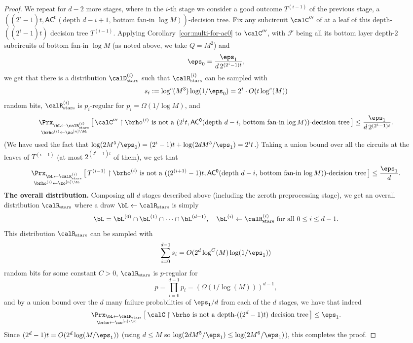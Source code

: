 \documentclass[11pt]{article}
\numberwithin{equation}{section}
\theoremstyle{definition}
\theoremstyle{plain}
\theoremstyle{plain}
\newcommand{\acz}{\mathsf{AC^0}}
\newcommand{\uhr}{\upharpoonright}
\newcommand{\stars}{\mathrm{stars}}
\begin{document}
\begin{proof}
 We repeat for $d-2$ more stages, where in the $i$-th stage we consider a good outcome $T^{(i-1)}$ of the previous stage, a $((2^{i}-1)t, \acz(\text{depth $d-i+1$, bottom fan-in $\log M$}))$-decision tree.  Fix any subcircuit $\calC'''$ of at a leaf of this depth-$((2^i-1)t)$ decision tree $T^{(i-1)}$.  Applying Corollary~\ref{cor:multi-for-ac0} to $\calC'''$, with $\mathscr{F}$ being all its bottom layer depth-$2$ subcircuits of bottom fan-in $\log M$ (as noted above, we take $Q = M^2$) and 
\[ \eps_0 = \frac{\eps_1}{d\,2^{(2^{i}-1)t}}, \] 
we get that there is a distribution $\calD_{\stars}^{(i)}$ such that $\calR_\stars^{(i)}$ can be sampled with 
\[ s_i := \log^c(M^3) \log(1/\eps_0) = 2^i \cdot O(t\log^c(M)) \] 
random bits, $\calR_\stars^{(i)}$ is $p_i$-regular for $p_i = \Omega(1/\log M)$, and
\[ \mathop{\Prx_{\bL\leftarrow\calR_\stars^{(i)}}}_{\brho^{(i)}\leftarrow\zo^{[n]\setminus \bL}}\big[\,\calC''' \uhr \brho^{(i)} \text{~is not a $(2^i t, \acz(\text{depth $d-i$, bottom fan-in $\log M$}))$-decision tree}\, \big] \le \frac{\eps_1}{d\,2^{(2^{i}-1)t}}. \]  
(We have used the fact that $\log(2M^{5}/\eps_0) = (2^i-1)t + \log(2dM^{5}/\eps_1) = 2^it$.)  Taking a union bound over all the circuits at the leaves of $T^{(i-1)}$ (at most $2^{(2^i-1)t}$ of them), we get that 
\[ \mathop{\Prx_{\bL\leftarrow\calR_\stars^{(i)}}}_{\brho^{(i)}\leftarrow\zo^{[n]\setminus \bL}}\big[\,T^{(i-1)} \uhr \brho^{(i)} \text{~is not a $((2^{(i+1)}-1)t, \acz(\text{depth $d-i$, bottom fan-in $\log M$}))$-decision tree}\, \big] \le \frac{\eps_1}{d}. \] 
{\bf The overall distribution.} Composing all $d$ stages described above (including the zeroth preprocessing stage), we get an overall distribution $\calR_\stars$ where a draw $\bL \leftarrow \calR_\stars$ is simply 
\[ \bL = \bL^{(0)} \cap \bL^{(1)} \cap \cdots \cap \bL^{(d-1)}, \quad \bL^{(i)} \leftarrow \calR_\stars^{(i)} \text{~for all $0\le i \le d-1$}. \]
This distribution $\calR_\stars$ can be sampled with 
\[ \sum_{i=0}^{d-1} s_i = O( 2^{d}  \log^C(M)\log(1/\eps_1)) \]
random bits for some constant $C > 0$, $\calR_\stars$ is $p$-regular for 
\[ p = \prod_{i=0}^{d-1} p_i = (\Omega(1/\log(M)))^{d-1}, \] 
and by a union bound over the $d$ many failure probabilities of $\eps_1/d$ from each of the $d$ stages, we have that indeed 
\[ \mathop{\Prx_{\bL\leftarrow\calR_\stars}}_{\brho\leftarrow\zo^{[n]\setminus \bL}}\big[\,\text{$\calC \uhr \brho$ is not a depth-$((2^d-1)t)$ decision tree}\,\big] \le \eps_1. \]
Since $(2^d-1)t = O( 2^d \log(M/\eps_1))$ (using $d \leq M$ so $\log(2dM^5/\eps_1) \leq \log(2M^6/\eps_1)$), this completes the proof. 
\end{proof} 
\end{document}
